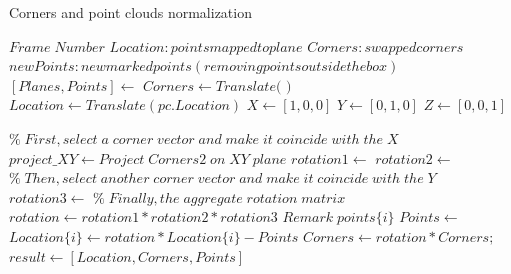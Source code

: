 \documentclass[10pt,a4paper]{article}
\begin{document}

\begin{algorithm}  
	\caption{Corners and point clouds normalization} 
	\label{alg:rotate}  
	\begin{algorithmic}[1]  
		\Require $Frame \;Number$ 
		\Ensure $Location: points mapped to plane$
		\Ensure $Corners: swapped corners$
		\Ensure $newPoints: new marked points (removing points outside the box)$
		\State $[Planes, Points] \gets$ 
		\State $Corners \gets Translate($ $)$
		\State $Location \gets Translate(pc.Location)$
		\State $X \gets [1,0,0]$
		\State $Y \gets [0,1,0]$
		\State $Z \gets [0,0,1]$
		
		\State $\% \;First,select \;a \;corner\;vector \;and \;make \;it\; coincide \;with \;the \;X $
		\State $project\_XY \gets Project \;Corners{2} \;on \;XY \;plane $
		\State $rotation1 \gets$
		\State $rotation2 \gets$
		\State $\% \;Then,select \;another \;corner\;vector \;and \;make \;it\; coincide \;with \;the \;Y $
		\State $rotation3 \gets$
		\State $\% \;Finally,the \;aggregate
		 \;rotation \; matrix$	
		\State $rotation \gets rotation1 * rotation2 * rotation3$
		\State $Remark \;points\{i\}$
		\State $Points \gets$ 
		\State $Location\{i\} \gets rotation * Location\{i\} - Points$
		\State $Corners \gets rotation * Corners;$
		\State $result\gets [Location,Corners,Points]$         
		\State {}  
		\EndFor
		\EndFunction
		
	\end{algorithmic}  
\end{algorithm}  
\end{document}
